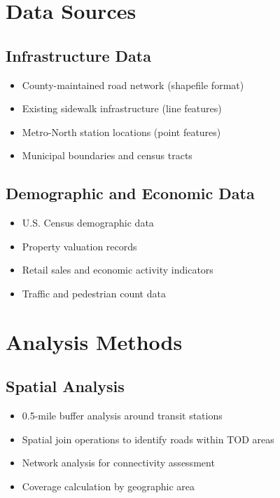 \documentclass[11pt,letterpaper]{report}
\begin{document}
\section{Data Sources}

\subsection{Infrastructure Data}
\begin{itemize}
    \item County-maintained road network (shapefile format)
    \item Existing sidewalk infrastructure (line features)
    \item Metro-North station locations (point features)
    \item Municipal boundaries and census tracts
\end{itemize}

\subsection{Demographic and Economic Data}
\begin{itemize}
    \item U.S. Census demographic data
    \item Property valuation records
    \item Retail sales and economic activity indicators
    \item Traffic and pedestrian count data
\end{itemize}

\section{Analysis Methods}

\subsection{Spatial Analysis}
\begin{itemize}
    \item 0.5-mile buffer analysis around transit stations
    \item Spatial join operations to identify roads within TOD areas
    \item Network analysis for connectivity assessment
    \item Coverage calculation by geographic area
\end{itemize}
\end{document}

